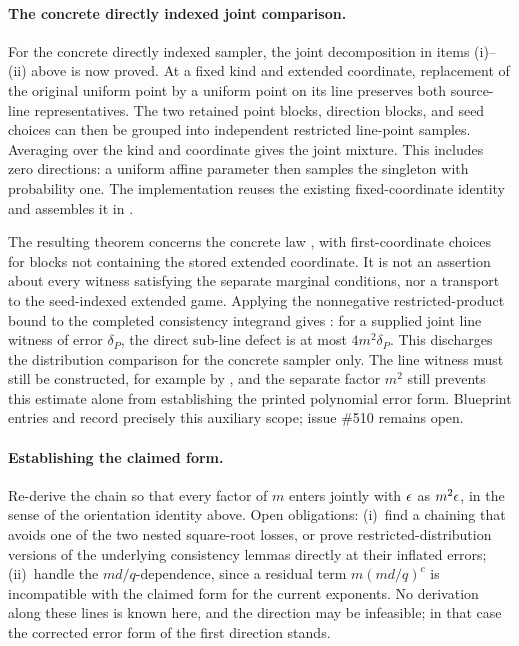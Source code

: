 \documentclass[11pt]{article}
\begin{document}
\paragraph{The concrete directly indexed joint comparison.}
For the concrete directly indexed sampler, the joint decomposition in
items (i)--(ii) above is now proved. At a fixed kind and extended coordinate,
replacement of the original uniform point by a uniform point on its line
preserves both source-line representatives. The two retained point blocks,
direction blocks, and seed choices can then be grouped into independent
restricted line-point samples. Averaging over the kind and coordinate gives
the joint mixture. This includes zero directions: a uniform affine parameter
then samples the singleton with probability one. The implementation reuses
the existing fixed-coordinate identity
 and assembles it in
.

The resulting theorem  concerns the concrete
law , with first-coordinate choices for blocks not
containing the stored extended coordinate. It is not an assertion about
every witness satisfying the separate marginal conditions, nor a transport
to the seed-indexed extended game. Applying the nonnegative
restricted-product bound to the completed consistency integrand gives
: for a supplied
joint line witness of error $\delta_P$, the direct sub-line defect is at
most $4m^2\delta_P$. This discharges the distribution comparison for the
concrete sampler only. The line witness must still be constructed, for
example by , and the separate
factor $m^2$ still prevents this estimate alone from establishing the printed
polynomial error form. Blueprint entries
 and
 record precisely this auxiliary
scope; issue \#510 remains open.

\paragraph{Establishing the claimed form.}
Re-derive the chain so that every factor of $m$ enters jointly with
$\epsilon$ as $m^2\epsilon$, in the sense of the orientation identity above.
Open obligations: (i)~find a chaining that avoids one of the two nested
square-root losses, or prove restricted-distribution versions of the
underlying consistency lemmas directly at their inflated errors;
(ii)~handle the $md/q$-dependence, since a residual term
$m (md/q)^{c}$ is incompatible with the claimed form for the current
exponents.  No derivation along these lines is known here, and the
direction may be infeasible; in that case the corrected error form of
the first direction stands.
\end{document}
